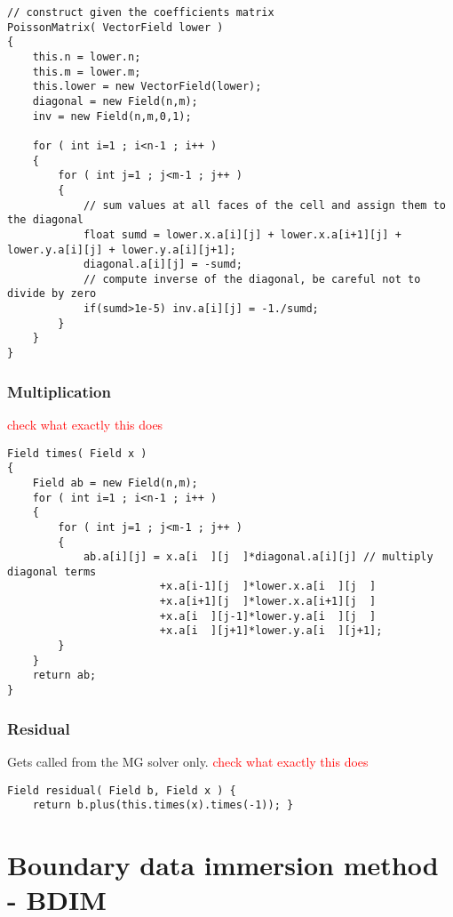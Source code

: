 \documentclass[notitlepage]{article}
\begin{document}
\begin{lstlisting}[style=myCpp]
// construct given the coefficients matrix
PoissonMatrix( VectorField lower )
{
	this.n = lower.n;
	this.m = lower.m;
	this.lower = new VectorField(lower);
	diagonal = new Field(n,m);
	inv = new Field(n,m,0,1);
	
	for ( int i=1 ; i<n-1 ; i++ )
	{
		for ( int j=1 ; j<m-1 ; j++ )
		{
			// sum values at all faces of the cell and assign them to the diagonal
			float sumd = lower.x.a[i][j] + lower.x.a[i+1][j] + lower.y.a[i][j] + lower.y.a[i][j+1];
			diagonal.a[i][j] = -sumd;
			// compute inverse of the diagonal, be careful not to divide by zero
			if(sumd>1e-5) inv.a[i][j] = -1./sumd;
		}
	}
}
\end{lstlisting}

\subsubsection{Multiplication}

\textcolor{red}{check what exactly this does}

\begin{lstlisting}[style=myCpp]
Field times( Field x )
{
	Field ab = new Field(n,m);
	for ( int i=1 ; i<n-1 ; i++ )
	{
		for ( int j=1 ; j<m-1 ; j++ )
		{
			ab.a[i][j] = x.a[i  ][j  ]*diagonal.a[i][j] // multiply diagonal terms
						+x.a[i-1][j  ]*lower.x.a[i  ][j  ]
						+x.a[i+1][j  ]*lower.x.a[i+1][j  ]
						+x.a[i  ][j-1]*lower.y.a[i  ][j  ]
						+x.a[i  ][j+1]*lower.y.a[i  ][j+1];
		}
	}
	return ab;
}
\end{lstlisting}

\subsubsection{Residual}

Gets called from the MG solver only.
\textcolor{red}{check what exactly this does}

\begin{lstlisting}[style=myCpp]
Field residual( Field b, Field x ) {
	return b.plus(this.times(x).times(-1)); }
\end{lstlisting}

\section{Boundary data immersion method - BDIM}
\end{document}
